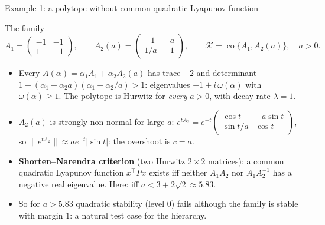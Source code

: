 \documentclass[10pt,aspectratio=169]{beamer}
\newcommand{\tr}{^{\top}}
\newcommand{\KK}{\mathcal{K}}
\DeclareMathOperator{\co}{co}
\begin{document}
\begin{frame}{Example 1: a polytope without common quadratic Lyapunov function}
\begin{block}{The family}
\[
A_1=\begin{pmatrix}-1&-1\\1&-1\end{pmatrix},\qquad A_2(a)=\begin{pmatrix}-1&-a\\1/a&-1\end{pmatrix},\qquad \KK=\co\{A_1,A_2(a)\},\quad a>0 .
\]
\end{block}
\begin{itemize}
\item Every $A(\alpha)=\alpha_1A_1+\alpha_2A_2(a)$ has trace $-2$ and determinant $1+(\alpha_1+\alpha_2a)(\alpha_1+\alpha_2/a)>1$: eigenvalues $-1\pm i\,\omega(\alpha)$ with $\omega(\alpha)\ge1$. The polytope is Hurwitz for \emph{every} $a>0$, with decay rate $\lambda=1$.
\item $A_2(a)$ is strongly \alert{non-normal} for large $a$: $e^{tA_2}=e^{-t}\begin{pmatrix}\cos t&-a\sin t\\ \sin t/a&\cos t\end{pmatrix}$, so $\|e^{tA_2}\|\approx ae^{-t}|\sin t|$: the overshoot is $c=a$.
\item \textbf{Shorten--Narendra criterion} (two Hurwitz $2\times2$ matrices): a common quadratic Lyapunov function $x\tr Px$ exists iff neither $A_1A_2$ nor $A_1A_2^{-1}$ has a negative real eigenvalue. Here: iff $a<3+2\sqrt2\approx5.83$.
\item So for $a>5.83$ quadratic stability (level $0$) fails although the family is stable with margin $1$: a natural test case for the hierarchy.
\end{itemize}
\end{frame}
\end{document}
